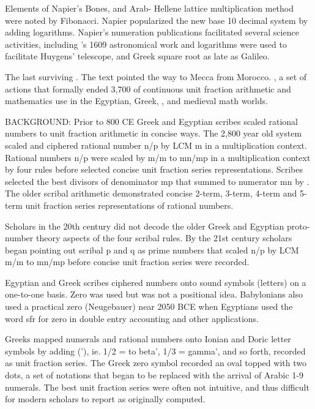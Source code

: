 \documentclass[12pt]{article}
\begin{document}
Elements of Napier's Bones, and Arab- Hellene lattice multiplication method were noted by Fibonacci. Napier popularized the new base 10 decimal system by adding logarithms. Napier's numeration publications facilitated several science activities, including 's 1609 astronomical work and logarithms were used to facilitate Huygens' telescope, and Greek square root as late as Galileo.

The last surviving . The text pointed the way to Mecca from Morocco. , a set of actions that formally ended 3,700 of continuous unit fraction arithmetic and mathematics use in the Egyptian, Greek, , and medieval math worlds. 

BACKGROUND: Prior to 800 CE Greek and Egyptian scribes scaled rational numbers to unit fraction arithmetic in concise ways. The 2,800 year old system scaled and ciphered rational number n/p by LCM m in a multiplication context. Rational numbers n/p were scaled by m/m to mn/mp in a multiplication context by four rules before selected concise unit fraction series representations. Scribes selected the best divisors of denominator mp that summed to numerator mn by . The older scribal arithmetic demonstrated concise 2-term, 3-term, 4-term and 5-term unit fraction series representations of rational numbers. 

Scholars in the 20th century did not decode the older Greek and Egyptian proto-number theory aspects of the four scribal rules. By the 21st century scholars began pointing out scribal p and q as prime numbers that scaled n/p by LCM m/m to mn/mp before concise unit fraction series were recorded. 

Egyptian and Greek scribes ciphered numbers onto sound symbols (letters) on a one-to-one basis. Zero was used but was not a positional idea. Babylonians also used a practical zero (Neugebauer) near 2050 BCE when Egyptians used the word sfr for zero in double entry accounting and other applications. 

Greeks mapped numerals and rational numbers onto Ionian and Doric letter symbols by adding ('), ie. 1/2 = to beta', 1/3 = gamma', and so forth, recorded as unit fraction series. The Greek zero symbol recorded an oval topped with two dots, a set of notations that began to be replaced with the arrival of Arabic 1-9 numerals. The best unit fraction series were often not intuitive, and thus difficult for modern scholars to report as originally computed.
\end{document}
